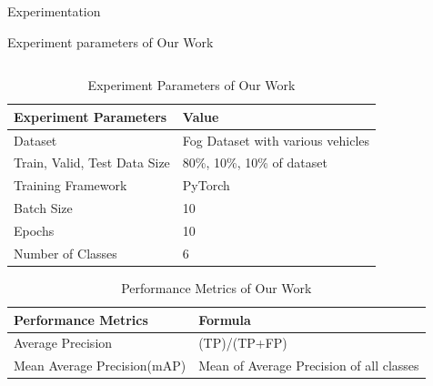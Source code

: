 \documentclass[10pt,aspectratio=169,t]{beamer}
\begin{document}
\begin{frame}[allowframebreaks]{Experimentation}
\newpage
\begin{block}{Experiment parameters of Our Work}
\end{block}
\begin{columns}
\begin{column}{1\textwidth}
\vspace{-0.66cm}
\begin{table}
\caption{Experiment Parameters of Our Work}\label{Table 3}
\centering
\begin{tabular}{ 
|p{5cm}|p{5cm}| }
 \hline
 \textbf{Experiment Parameters} & \textbf{Value} \\
 \hline
 Dataset & Fog Dataset with various vehicles\\
 \hline
Train, Valid, Test Data Size & 80\%, 10\%, 10\% of dataset\\
\hline
Training Framework & PyTorch\\  
\hline
Batch Size & 10\\
\hline
Epochs & 10\\
\hline 
Number of Classes &	6\\ \hline
\end{tabular}
\end{table}


\vspace{-0.65cm}
\begin{table}
\caption{Performance Metrics of Our Work}\label{Table 4}
\centering
\begin{tabular}{ 
|p{5cm}|p{7cm}| }
 \hline
 \textbf{Performance Metrics} & \textbf{Formula} \\
 \hline
 Average Precision & (TP)/(TP+FP)\\ \hline
Mean Average Precision(mAP) & Mean of Average Precision of all classes\\ \hline
\end{tabular}
\end{table}
\end{column}
\end{columns}





\end{frame}
\end{document}

